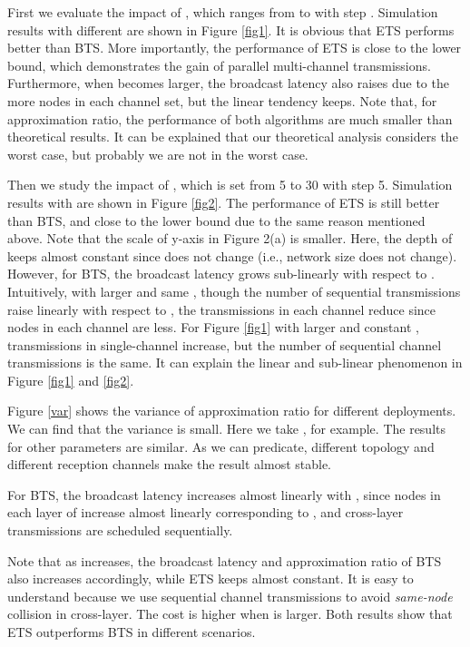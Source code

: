 \documentclass[10pt, conference]{IEEEtran}
\begin{document}
First we evaluate the impact of , which ranges from  to
 with step . Simulation results with different  are shown in Figure \ref{fig1}. It is obvious that
ETS performs better than BTS. More importantly, the performance
of ETS is close to the lower bound, which demonstrates the gain
of parallel multi-channel transmissions. Furthermore, when 
becomes larger, the broadcast latency also raises due to the
more nodes in each channel set, but the linear tendency keeps.
Note that, for approximation ratio, the performance of both
algorithms are much smaller than theoretical results. It can be
explained that our theoretical analysis considers the worst
case, but probably we are not in the worst case. 


Then we study the impact of , which is set from 5 to 30 with
step 5. Simulation results with  are shown
in Figure \ref{fig2}. The performance of ETS is still better
than BTS, and close to the lower bound due to the same reason
mentioned above. Note that the scale of y-axis in Figure 2(a)
is smaller. Here, the depth of  keeps almost constant
since  does not change (i.e., network size does not change).
However, for BTS, the broadcast latency grows sub-linearly with
respect to . Intuitively, with larger  and same ,
though the number of sequential transmissions raise linearly
with respect to , the transmissions in each channel reduce
since nodes in each channel are less. For Figure \ref{fig1}
with larger  and constant , transmissions in
single-channel increase, but the number of sequential channel
transmissions is the same. It can explain the linear and
sub-linear phenomenon in Figure \ref{fig1} and \ref{fig2}.

\iffalse
Figure \ref{var} shows the variance of approximation ratio for different deployments.
We can find that the variance is small. Here we take ,  for
example. The results for other parameters are similar. As we can
predicate, different topology and different reception channels
make the result almost stable.

For BTS, the broadcast latency increases almost
linearly with , since nodes in each layer of 
increase almost linearly corresponding to , and cross-layer
transmissions are scheduled sequentially.

 Note that as  increases, the
broadcast latency and approximation ratio of BTS also increases
accordingly, while ETS keeps almost constant. It is easy to
understand because we use sequential channel transmissions to
avoid \emph{same-node} collision in cross-layer. The cost is
higher when  is larger. Both results show that ETS
outperforms BTS in different scenarios.
\end{document}
